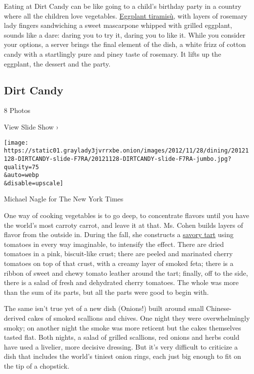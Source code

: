 Eating at Dirt Candy can be like going to a child's birthday party in a
country where all the children love vegetables.
\href{http://www.dirtcandynyc.com/?p=4268}{Eggplant tiramisù}, with
layers of rosemary lady fingers sandwiching a sweet mascarpone whipped
with grilled eggplant, sounds like a dare: daring you to try it, daring
you to like it. While you consider your options, a server brings the
final element of the dish, a white frizz of cotton candy with a
startlingly pure and piney taste of rosemary. It lifts up the eggplant,
the dessert and the party.

\href{https://www.nytimes3xbfgragh.onion/slideshow/2012/11/28/dining/20121128-DIRTCANDY.html}{}

\hypertarget{dirt-candy}{%
\subsection{Dirt Candy}\label{dirt-candy}}

8 Photos

View Slide Show ›

\texttt{[image: https://static01.graylady3jvrrxbe.onion/images/2012/11/28/dining/20121128-DIRTCANDY-slide-F7RA/20121128-DIRTCANDY-slide-F7RA-jumbo.jpg?quality=75\\\&auto=webp\\\&disable=upscale]}

Michael Nagle for The New York Times

One way of cooking vegetables is to go deep, to concentrate flavors
until you have the world's most carroty carrot, and leave it at that.
Ms. Cohen builds layers of flavor from the outside in. During the fall,
she constructs a \href{http://www.dirtcandynyc.com/?p=4914}{savory tart}
using tomatoes in every way imaginable, to intensify the effect. There
are dried tomatoes in a pink, biscuit-like crust; there are peeled and
marinated cherry tomatoes on top of that crust, with a creamy layer of
smoked feta; there is a ribbon of sweet and chewy tomato leather around
the tart; finally, off to the side, there is a salad of fresh and
dehydrated cherry tomatoes. The whole was more than the sum of its
parts, but all the parts were good to begin with.

The same isn't true yet of a new dish (Onions!) built around small
Chinese-derived cakes of smoked scallions and chives. One night they
were overwhelmingly smoky; on another night the smoke was more reticent
but the cakes themselves tasted flat. Both nights, a salad of grilled
scallions, red onions and herbs could have used a livelier, more
decisive dressing. But it's very difficult to criticize a dish that
includes the world's tiniest onion rings, each just big enough to fit on
the tip of a chopstick.

